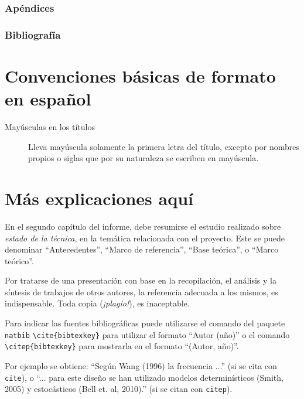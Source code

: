 \subsubsection{Apéndices}

\subsubsection{Bibliografía}

\section{Convenciones básicas de formato en español}

\begin{description}
\item[Mayúsculas en los títulos] Lleva mayúscula solamente la primera letra del título, excepto por nombres propios o siglas que por su naturaleza se escriben en mayúscula.
\end{description}


\section{Más explicaciones aquí}

En el segundo capítulo del informe, debe resumirse el estudio realizado sobre \emph{estado de la técnica}, en la temática relacionada con el proyecto.  Este se puede denominar ``Antecedentes'', ``Marco de referencia'', ``Base teórica'', o ``Marco teórico''.

Por tratarse de una presentación con base en la recopilación, el análisis y la síntesis de trabajos de otros autores, la referencia adecuada a los mismos, es indispensable.  Toda copia (\emph{¡plagio!}), es inaceptable.

Para indicar las fuentes bibliográficas puede utilizarse el comando del paquete \texttt{natbib} \texttt{\textbackslash cite\{bibtexkey\}} para utilizar el formato ``Autor (año)'' o el comando \texttt{\textbackslash citep\{bibtexkey\}} para mostrarla en el formato ``(Autor, año)''.

Por ejemplo se obtiene: ``Según Wang (1996) la frecuencia ...'' (si se cita con \texttt{cite}), o ``... para este diseño se han utilizado modelos determinísticos (Smith, 2005) y estocásticos (Bell et. al, 2010).''  (si se citan con \texttt{citep}).  


